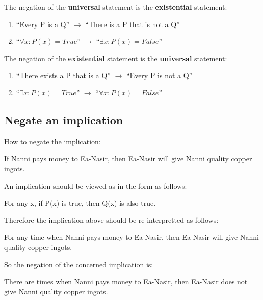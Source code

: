 \documentclass[12pt, letterpaper, oneside]{book}
\begin{document}
The negation of the \textbf{universal} statement is the \textbf{existential}
statement:
\begin{enumerate}
  \item ``Every P is a Q'' $\rightarrow$ ``There is a P that is not a Q''
  \item ``$\forall x: P(x)=True$'' $\rightarrow$ ``$\exists x: P(x)=False$''
\end{enumerate}

The negation of the \textbf{existential} statement is the \textbf{universal}
statement:
\begin{enumerate}
  \item ``There exists a P that is a Q'' $\rightarrow$ ``Every P is not a Q''
  \item ``$\exists x: P(x)=True$'' $\rightarrow$ ``$\forall x: P(x)=False$''
\end{enumerate}

\subsection{Negate an implication}

How to negate the implication:

\begin{displayquote}
  If Nanni pays money to Ea-Nasir, then Ea-Nasir will give Nanni quality copper
  ingots.
\end{displayquote}

An implication should be viewed as in the form as follows:

\begin{displayquote}
  For any x, if P(x) is true, then Q(x) is also true.
\end{displayquote}

Therefore the implication above should be re-interpretted as follows:

\begin{displayquote}
  For any time when Nanni pays money to Ea-Nasir, then Ea-Nasir will give Nanni
  quality copper ingots.
\end{displayquote}

So the negation of the concerned implication is:

\begin{displayquote}
  There are times when Nanni pays money to Ea-Nasir, then Ea-Nasir does not
  give Nanni quality copper ingots.
\end{displayquote}
\end{document}
